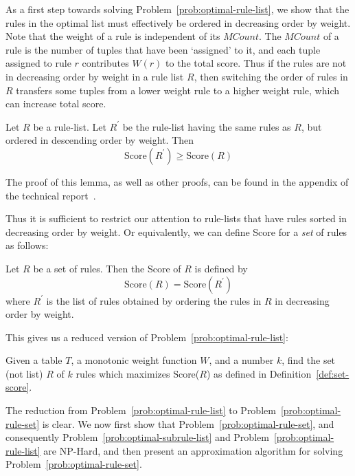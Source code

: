 As a first step towards solving Problem~\ref{prob:optimal-rule-list}, we show that the rules in the optimal list must effectively be ordered in decreasing order by weight. Note that the weight of a rule is independent of its $MCount$. The $MCount$ of a rule is the number of tuples that have been `assigned' to it, and each tuple assigned to rule $r$ contributes $W(r)$ to the total score. Thus if the rules are not in decreasing order by weight in a rule list $R$, then switching the order of rules in $R$ transfers some tuples from a lower weight rule to a higher weight rule, which can increase total score.

\begin{lemma}\label{lemma:rule-ordering}
Let $R$ be a rule-list. Let $R^{\prime}$ be the rule-list having the same rules as $R$, but ordered in descending order by weight. Then
$$\text{Score}(R^{\prime}) \geq \text{Score}(R)$$
\end{lemma}
The proof of this lemma, as well as other proofs, can be found in the appendix of the technical report~\cite{tr}. 

\noindent Thus it is sufficient to restrict our attention to rule-lists that have rules sorted in decreasing order by weight. Or equivalently, we can define Score for a \emph{set} of rules as follows:

\begin{definition}\label{def:set-score}
Let $R$ be a set of rules. Then the Score of $R$ is defined by
$$\text{Score}(R) = \text{Score}(R^{\prime})$$
where $R^{\prime}$ is the list of rules obtained by ordering the rules in $R$ in decreasing order by weight.
\end{definition}

This gives us a reduced version of Problem~\ref{prob:optimal-rule-list}: 
\begin{problem}\label{prob:optimal-rule-set}
Given a table $T$, a monotonic weight function $W$, and a number $k$, find the set (not list) $R$ of $k$ rules which maximizes Score($R$) as defined in Definition~\ref{def:set-score}.
\end{problem}

\noindent The reduction from Problem~\ref{prob:optimal-rule-list} to Problem~\ref{prob:optimal-rule-set} is clear. We now first show that Problem~\ref{prob:optimal-rule-set}, and consequently Problem~\ref{prob:optimal-subrule-list} and Problem~\ref{prob:optimal-rule-list} are NP-Hard, and then present an approximation algorithm for solving Problem~\ref{prob:optimal-rule-set}.

